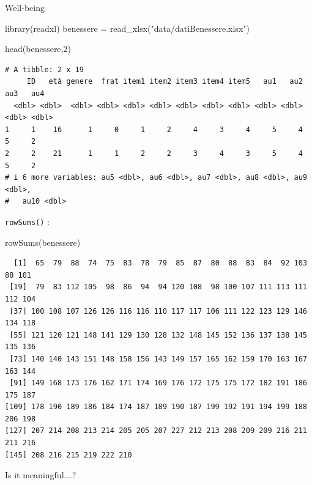 \documentclass[
  ignorenonframetext,
]{beamer}
\newenvironment{Shaded}{\begin{snugshade}}{\end{snugshade}}
\newcommand{\DecValTok}[1]{\textcolor[rgb]{0.69,0.50,0.00}{#1}}
\newcommand{\FunctionTok}[1]{\textcolor[rgb]{0.39,0.29,0.61}{#1}}
\newcommand{\NormalTok}[1]{\textcolor[rgb]{0.12,0.11,0.11}{#1}}
\newcommand{\OtherTok}[1]{\textcolor[rgb]{0.00,0.43,0.16}{#1}}
\newcommand{\StringTok}[1]{\textcolor[rgb]{0.75,0.01,0.01}{#1}}
\begin{document}
\begin{frame}[fragile]{Well-being}
\protect\hypertarget{well-being}{}
\small

\begin{Shaded}
\begin{Highlighting}[]
\FunctionTok{library}\NormalTok{(readxl)}
\NormalTok{benessere }\OtherTok{=} \FunctionTok{read\_xlsx}\NormalTok{(}\StringTok{"data/datiBenessere.xlsx"}\NormalTok{)}

\FunctionTok{head}\NormalTok{(benessere,}\DecValTok{2}\NormalTok{)}
\end{Highlighting}
\end{Shaded}

\begin{verbatim}
# A tibble: 2 x 19
     ID   età genere  frat item1 item2 item3 item4 item5   au1   au2   au3   au4
  <dbl> <dbl>  <dbl> <dbl> <dbl> <dbl> <dbl> <dbl> <dbl> <dbl> <dbl> <dbl> <dbl>
1     1    16      1     0     1     2     4     3     4     5     4     5     2
2     2    21      1     1     2     2     3     4     3     5     4     5     2
# i 6 more variables: au5 <dbl>, au6 <dbl>, au7 <dbl>, au8 <dbl>, au9 <dbl>,
#   au10 <dbl>
\end{verbatim}

\normalsize

\texttt{rowSums()} :

\small

\begin{Shaded}
\begin{Highlighting}[]
\FunctionTok{rowSums}\NormalTok{(benessere)}
\end{Highlighting}
\end{Shaded}

\begin{verbatim}
  [1]  65  79  88  74  75  83  78  79  85  87  80  88  83  84  92 103  88 101
 [19]  79  83 112 105  98  86  94  94 120 108  98 100 107 111 113 111 112 104
 [37] 100 108 107 126 126 116 116 110 117 117 106 111 122 123 129 146 134 118
 [55] 121 120 121 148 141 129 130 128 132 148 145 152 136 137 138 145 135 136
 [73] 140 140 143 151 148 158 156 143 149 157 165 162 159 170 163 167 163 144
 [91] 149 168 173 176 162 171 174 169 176 172 175 175 172 182 191 186 175 187
[109] 178 190 189 186 184 174 187 189 190 187 199 192 191 194 199 188 206 198
[127] 207 214 208 213 214 205 205 207 227 212 213 208 209 209 216 211 211 216
[145] 208 216 215 219 222 210
\end{verbatim}

Is it meaningful\ldots.?
\end{frame}
\end{document}
